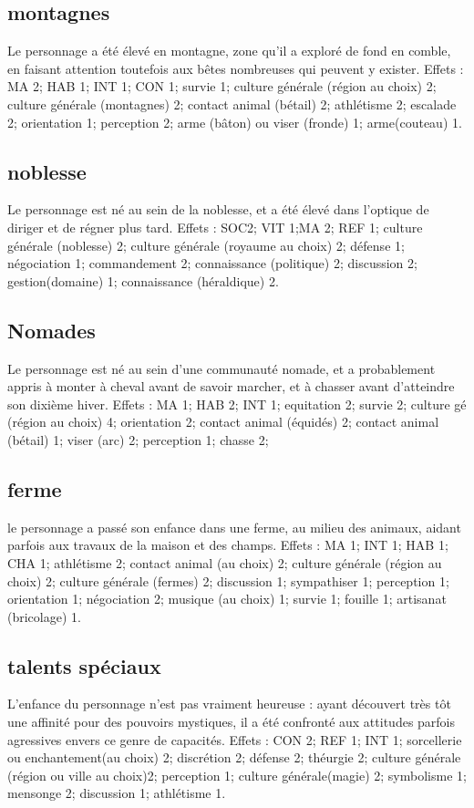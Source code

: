 \documentclass[10pt,a4paper,twocolumn]{book}
\begin{document}
\subsection*{montagnes}
Le personnage a été élevé en montagne, zone qu’il a exploré de fond en comble, en faisant attention toutefois aux bêtes nombreuses qui peuvent y exister.
Effets : MA 2; HAB 1; INT 1; CON 1; survie 1; culture générale (région au choix) 2; culture générale (montagnes) 2; contact animal (bétail) 2; athlétisme 2;  escalade 2; orientation 1; perception 2; arme (bâton) ou viser (fronde) 1; arme(couteau) 1.
\subsection*{noblesse}
Le personnage est né au sein de la noblesse, et a été élevé dans l’optique de diriger et de régner plus tard.
Effets : SOC2; VIT 1;MA 2; REF 1; culture générale (noblesse) 2; culture générale (royaume au choix) 2; défense 1; négociation 1; commandement 2; connaissance (politique) 2; discussion 2; gestion(domaine) 1; connaissance (héraldique) 2. 
\subsection*{Nomades}
Le personnage est né au sein d’une communauté nomade, et a probablement appris à monter à cheval avant de savoir marcher, et à chasser avant d’atteindre son dixième hiver.
Effets : MA 1; HAB 2; INT 1; equitation 2; survie 2; culture gé (région au choix) 4; orientation 2; contact animal (équidés) 2; contact animal (bétail) 1; viser (arc) 2; perception 1; chasse 2;
\subsection*{ferme}
le personnage a passé son enfance dans une ferme, au milieu des animaux, aidant parfois aux travaux de la maison et des champs.
Effets : MA 1; INT 1; HAB 1; CHA 1; athlétisme 2; contact animal (au choix) 2;  culture générale (région au choix) 2; culture générale (fermes) 2; discussion 1; sympathiser 1; perception 1; orientation 1; négociation 2; musique (au choix) 1; survie 1; fouille 1; artisanat (bricolage) 1.
\subsection*{talents spéciaux}
L’enfance du personnage n’est pas vraiment heureuse : ayant découvert très tôt une affinité pour des pouvoirs mystiques, il a été confronté aux attitudes parfois agressives envers ce genre de capacités.
Effets : CON 2; REF 1; INT 1; sorcellerie ou enchantement(au choix) 2; discrétion 2; défense 2; théurgie 2; culture générale (région ou ville au choix)2; perception 1; culture générale(magie) 2; symbolisme 1; mensonge 2; discussion 1; athlétisme 1.
\end{document}
